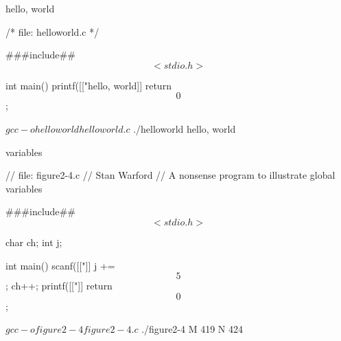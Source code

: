\documentclass[10pt,t]{beamer}
\begin{document}
  \begin{frame}[fragile]{hello, world}
    \begin{codeblock}
    /* file: helloworld.c */

    ###include## $$<stdio.h>$$

    int main() {
      printf([["hello, world]]%
      return $$0$$;
    }
    \end{codeblock}

    \begin{termblock}
    $ gcc -o helloworld helloworld.c
    $ ./helloworld
    hello, world
    \end{termblock}

  \end{frame}

  \begin{frame}[fragile]{variables}
    \begin{scriptsize}
      \begin{codeblock}
      // file: figure2-4.c
      // Stan Warford
      // A nonsense program to illustrate global variables

      ###include## $$<stdio.h>$$

      char ch;
      int j;

      int main() {
        scanf([["]]%
        j += $$5$$;
        ch++;
        printf([["]]%
        return $$0$$;
      }
      \end{codeblock}
    \end{scriptsize}

    \begin{scriptsize}
      \begin{termblock}
      $ gcc -o figure2-4 figure2-4.c
      $ ./figure2-4
      M 419
      N
      424
      \end{termblock}
    \end{scriptsize}

  \end{frame}
\end{document}
